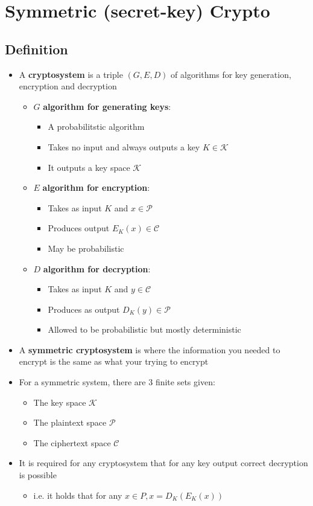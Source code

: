 \section{Symmetric (secret-key) Crypto}
\subsection{Definition}
\begin{itemize}
  \item A \textbf{cryptosystem} is a triple $(G,E,D)$ of algorithms for key generation, encryption and decryption
  \begin{itemize}
  	\item $G$ \textbf{algorithm for generating keys}:
    \begin{itemize}
  		\item A probabilitstic algorithm
  		\item Takes no input and always outputs a key $K \in \mathcal K$
  		\item It outputs a key space $\mathcal K$ 
    \end{itemize}
  	\item $E$ \textbf{algorithm for encryption}:
    \begin{itemize}
  		\item Takes as input $K$ and $x \in \mathcal P$
  		\item Produces output $E_K(x) \in \mathcal C$
  		\item May be probabilistic
    \end{itemize}
  	\item $D$ \textbf{algorithm for decryption}:
    \begin{itemize}
  		\item Takes as input $K$ and $y \in \mathcal C$
  		\item Produces as output $D_K(y) \in \mathcal P$
  		\item Allowed to be probabilistic but mostly deterministic
    \end{itemize}
  \end{itemize}
  \item A \textbf{symmetric cryptosystem} is where the information you needed to encrypt is the same as what your trying to encrypt
  \item For a symmetric system, there are 3 finite sets given:
  \begin{itemize}
  	\item The key space $\mathcal K$
  	\item The plaintext space $\mathcal P$
  	\item The ciphertext space $\mathcal C$  
  \end{itemize}
  \item It is required for any cryptosystem that for any key output correct decryption is possible
  \begin{itemize}
  	\item i.e. it holds that for any $x \in P, x = D_K(E_K(x))$
  \end{itemize}
\end{itemize}

